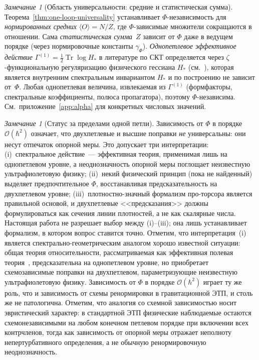\documentclass[12pt,a4paper]{article}
\theoremstyle{plain}
\theoremstyle{definition}
\theoremstyle{remark}
\newtheorem{remark}[theorem]{Замечание}
\newcommand{\Tr}{\operatorname{Tr}}
\newcommand{\half}{\tfrac{1}{2}}
\newcommand{\order}{\mathcal{O}}
\begin{document}
\begin{remark}[Область универсальности: средние и статистическая сумма]
\label{rem:univ-scope}
Теорема~\ref{thm:one-loop-universality} устанавливает
$\Phi$-независимость для \emph{нормированных средних}
$\langle O\rangle = N/Z$, где $\Phi$-зависимые множители
сокращаются в отношении.  Сама \emph{статистическая сумма}~$Z$
зависит от $\Phi$ даже в ведущем порядке (через нормировочные
константы $\gamma_\Phi$).  \emph{Однопетлевое эффективное действие}
$\Gamma^{(1)} = \half\Tr\log H_*$ в литературе по СКТ определяется
через $\zeta$-функциональную регуляризацию физического гессиана
$H_*$ (см.~\cite{Alfyorov:2026ff}), которая является внутренним
спектральным инвариантом $H_*$ и по построению не зависит
от~$\Phi$.  Любая однопетлевая величина, извлекаемая из
$\Gamma^{(1)}$ (формфакторы, спектральные коэффициенты, полюса
пропагатора), поэтому $\Phi$-независима.
См.\ приложение~\ref{app:alpha} для конкретных числовых значений.
\end{remark}

\begin{remark}[Статус за пределами одной петли]
\label{rem:beyond-one-loop}
Зависимость от $\Phi$ в порядке $\order(\hbar^2)$ означает, что
двухпетлевые и высшие поправки \emph{не} универсальны: они несут
отпечаток опорной меры.  Это допускает три интерпретации:
(i)~спектральное действие~--- эффективная теория, применимая лишь
на однопетлевом уровне, а неоднозначность опорной меры поглощает
неизвестную ультрафиолетовую физику;
(ii)~некий физический принцип (пока не найденный) выделяет
предпочтительное $\Phi$, восстанавливая предсказательность на
двухпетлевом уровне;
(iii)~плотностно-значный формализм про-торсора является правильной
основой, и двухпетлевые <<предсказания>> должны формулироваться как
сечения линии плотностей, а не как скалярные числа.
Настоящая работа не разрешает выбор между (i)--(iii); она лишь
устанавливает формализм, в котором вопрос ставится точно.
Отметим, что интерпретация~(i) является спектрально-геометрическим
аналогом хорошо известной ситуации: общая теория относительности,
рассматриваемая как эффективная полевая теория~\cite{Donoghue:1994},
предсказательна на однопетлевом уровне, но приобретает
схемозависимые поправки на двухпетлевом, параметризующие
неизвестную ультрафиолетовую физику.  Зависимость от $\Phi$ в порядке
$\order(\hbar^2)$ играет ту же роль, что и зависимость от схемы
ренормировки в гравитационной ЭТП, и столь же не патологична.
Отметим, что аналогия со схемной зависимостью носит эвристический
характер: в стандартной ЭТП физические наблюдаемые остаются
схемонезависимыми на любом конечном петлевом порядке при включении
всех контрчленов, тогда как зависимость от опорной меры отражает
неполноту непертурбативного определения, а не обычную
ренормировочную неоднозначность.
\end{remark}
\end{document}
